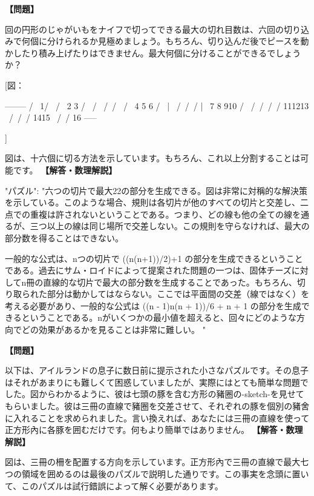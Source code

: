 \documentclass[10pt,a4paper,oneside,openany]{ltjsbook}
\begin{document}
\begin{tcolorbox}[colback=softblue,colframe=primaryblue,title=\textbf{第 164 問：THE POTATO PUZZLE.},arc=2mm,boxrule=1pt,breakable]
\textbf{【問題】}\par\vspace{0.3em}
回の円形のじゃがいもをナイフで切ってできる最大の切れ目数は、六回の切り込みで何個に分けられるか見極めましょう。もちろん、切り込んだ後でピースを動かしたり積み上げたりはできません。最大何個に分けることができるでしょうか？

[図：

          --------
        /   \ 1/   \
       / \ 2 \/ 3 / \
      /   \  /\  /   \
     / \ 4 \/ 5\/ 6 / \
    |   \  /\  /\  /   |
     \  7\/ 8\/ 9\/10 /
      \  /\  /\  /\  /
       \/11\/12\/13\/
        \  /\  /\  /
         \/14\/15\/
          \  /\  /
           \/16\/
           -----

]

図は、十六個に切る方法を示しています。もちろん、これ以上分割することは可能です。
\tcblower
\textbf{【解答・数理解説】}\par\vspace{0.3em}
{
"パズル": "六つの切片で最大22の部分を生成できる。図は非常に対稱的な解決策を示している。このような場合、規則は各切片が他のすべての切片と交差し、二点での重複は許されないということである。つまり、どの線も他の全ての線を通るが、三つ以上の線は同じ場所で交差しない。この規則を守らなければ、最大の部分数を得ることはできない。

一般的な公式は、nつの切片で ((n(n+1))/2)+1 の部分を生成できるということである。過去にサム・ロイドによって提案された問題の一つは、固体チーズに対してn冊の直線的な切片で最大の部分数を生成することであった。もちろん、切り取られた部分は動かしてはならない。ここでは平面間の交差（線ではなく）を考える必要があり、一般的な公式は ((n - 1)n(n + 1))/6 + n + 1 の部分を生成できるということである。nがいくつかの最小値を超えると、回々にどのような方向でどの効果があるかを見ることは非常に難しい。
"
}
\end{tcolorbox}

\begin{tcolorbox}[colback=softblue,colframe=primaryblue,title=\textbf{第 165 問：七頭の豚 （原題: THE SEVEN PIGS.）},arc=2mm,boxrule=1pt,breakable]
\textbf{【問題】}\par\vspace{0.3em}
以下は、アイルランドの息子に数日前に提示された小さなパズルです。その息子はそれがあまりにも難しくて困惑していましたが、実際にはとても簡単な問題でした。図からわかるように、彼は七頭の豚を含む方形の豬圈の-sketch-を見せてもらいました。彼は三冊の直線で豬圈を交差させて、それぞれの豚を個別の豬舍に入れることを求められました。言い換えれば、あなたには三冊の直線を使って正方形內に各豚を囲むだけです。何もより簡単ではありません。
\tcblower
\textbf{【解答・数理解説】}\par\vspace{0.3em}
図は、三冊の柵を配置する方向を示しています。正方形內で三冊の直線で最大七つの領域を囲めるのは最後のパズルで説明した通りです。この事実を念頭に置いて、このパズルは試行錯誤によって解く必要があります。
\end{tcolorbox}
\end{document}
